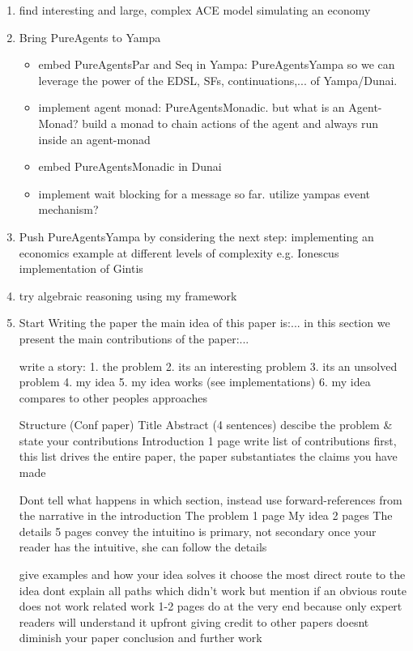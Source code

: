 \begin{enumerate}
\item find interesting and large, complex ACE model simulating an economy

\item Bring PureAgents to Yampa
	\begin{itemize}
		\item embed PureAgentsPar and Seq in Yampa: PureAgentsYampa so we can leverage the power of the EDSL, SFs, continuations,... of Yampa/Dunai.
		\item implement agent monad: PureAgentsMonadic. but what is an Agent-Monad? build a monad to chain actions of the agent and always run inside an agent-monad
		\item embed PureAgentsMonadic in Dunai
		\item implement wait blocking for a message so far. utilize yampas event mechanism?
	\end{itemize}
	
\item Push PureAgentsYampa by considering the next step: implementing an economics example at different levels of complexity e.g. Ionescus implementation of Gintis

\item try algebraic reasoning using my framework

\item Start Writing the paper
the main idea of this paper is:...
in this section we present the main contributions of the paper:...

write a story:
	1. the problem
	2. its an interesting problem
	3. its an unsolved problem
	4. my idea
	5. my idea works (see implementations)
	6. my idea compares to other peoples approaches
	
Structure (Conf paper)
	Title
	Abstract (4 sentences)
		descibe the problem & state your contributions
	Introduction 1 page
		write list of contributions first,
		this list drives the entire paper,
		the paper substantiates the claims you have made
		
		Dont tell what happens in which section,
		instead use forward-references from the
		narrative in the introduction
	The problem 1 page
	My idea 2 pages
	The details 5 pages
		convey the intuitino is primary, not secondary
		once your reader has the intuitive, she can follow the details
		
		give examples and how your idea solves it
		choose the most direct route to the idea
			dont explain all paths which didn't work
			but mention if an obvious route does not work
	related work 1-2 pages
		do at the very end because only expert readers will understand it upfront
		giving credit to other papers doesnt diminish your paper
	conclusion and further work



\end{enumerate}
